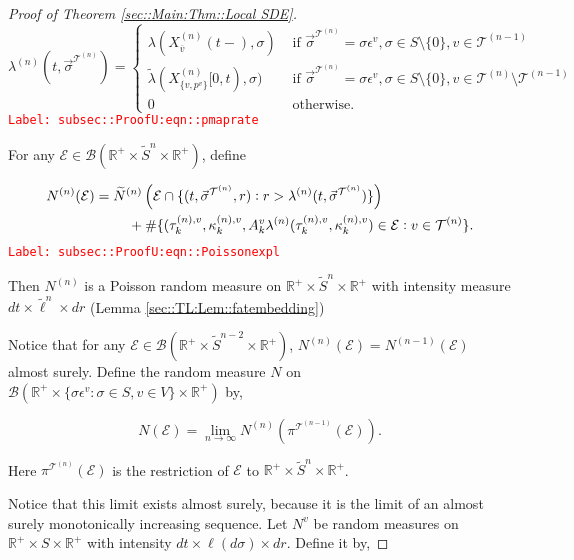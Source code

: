 \documentclass[12pt]{article}
\newcommand{\mb}{\mathbb}
\newcommand{\mc}{\mathcal}
\newcommand{\ms}{\mathscr}
\newcommand{\ra}{\rightarrow}
\newcommand{\ov}{\overline}
\newcommand{\te}{\text}
\newcommand{\ep}{\epsilon}
\newcommand{\tr}{\textcolor{red}}
\newcommand{\labe}[1]{\tr{\texttt{Label: #1}}}
\newcommand{\ind}{\hspace{24pt}}
\renewcommand{\v}{v}							%
\renewcommand{\S}{S}							%
\newcommand{\s}{\sigma}							%
\newcommand{\sv}{\vec{\s}}						%
\newcommand{\ev}{\ep}							%
\renewcommand{\t}{t}							%
\newcommand{\proj}{\pi}							%
\newcommand{\X}{X}								%
\newcommand{\vind}[1]{^{#1}}					%
\newcommand{\vsi}[1]{^{#1}}						%
\newcommand{\cind}[1]{_{#1}}					%
\newcommand{\cl}{\ov}							%
\newcommand{\tp}[1]{(#1)}						%
\newcommand{\tip}[1]{#1}						%
\newcommand{\slnvind}[2]{^{(#1),#2}}				%
\newcommand{\tree}{\mc{T}}						%
\newcommand{\sln}[1]{^{(#1)}}					%
\newcommand{\poiss}{N}							%
\newcommand{\Sm}{\ell}							%
\newcommand{\rate}{\lambda}						%
\renewcommand{\r}{r}							%
\newcommand{\alt}[1]{\widetilde{#1}}			%
\newcommand{\indx}[1]{_{#1}}					%
\newcommand{\rt}{\tau}							%
\renewcommand{\it}{k}							%
\newcommand{\evnt}{\mc{E}}						%
\newcommand{\rv}{A}								%
\renewcommand{\mark}{\kappa}					%
\newcommand{\crate}{\alt{\lambda}}				%
\newcommand{\p}{p}								%
\begin{document}
\begin{proof}[Proof of Theorem \ref{sec::Main:Thm::Local SDE}]
\begin{equation}
\rate\sln{n}(\t,\sv\vsi{\tree\sln{n}}) = \begin{cases}
\rate(\X\sln{n}\cind{\cl{\v}}\tp{\t-},\s) &\te{ if } \sv\vsi{\tree\sln{n}} = \s\ev\vind{\v},\s \in \S\setminus\{0\},\v\in\tree\sln{n-1}\\
\crate(\X\sln{n}\cind{\{\v,\p\vind{\v}\}}\tip{[0,\t)},\s) &\te{ if } \sv\vsi{\tree\sln{n}} = \s\ev\vind{\v},\s\in\S\setminus\{0\},\v\in\tree\sln{n}\setminus\tree\sln{n-1}\\
0 &\te{ otherwise.}
\end{cases}
\label{subsec::ProofU:eqn::pmaprate}
\end{equation}
\labe{subsec::ProofU:eqn::pmaprate}

For any \(\evnt \in \ms{B}(\mb{R}^+\times\alt{\S}^n\times\mb{R}^+)\), define

\begin{align}
\poiss\sln{n}(\evnt)& = \alt{\poiss}\sln{n}\left(\evnt\cap\{(\t,\sv\vsi{\tree\sln{n}},\r):\r > \rate\sln{n}(\t,\sv\vsi{\tree\sln{n}})\}\right)\nonumber\\
&\hspace{24 pt} + \#\{(\rt\slnvind{n}{\v}\indx{\it},\mark\indx{\it}\slnvind{n}{\v},\rv\vind{\v}\indx{\it}\rate\sln{n}(\rt\slnvind{n}{\v}\indx{\it},\mark\indx{\it}\slnvind{n}{\v}) \in \evnt: \v\in \tree\sln{n}\}.
\label{subsec::ProofU:eqn::Poissonexpl}
\end{align}
\labe{subsec::ProofU:eqn::Poissonexpl}

Then \(\poiss\sln{n}\) is a Poisson random measure on \(\mb{R}^+\times\alt{\S}^n\times \mb{R}^+\) with intensity measure \(d\t\times \alt{\Sm}^n\times d\r\) (Lemma \ref{sec::TL:Lem::fatembedding})

\ind Notice that for any \(\evnt \in \ms{B}(\mb{R}^+\times \alt{\S}^{n-2}\times \mb{R}^+)\), \(\poiss\sln{n}(\evnt) = \poiss\sln{n-1}(\evnt)\) almost surely. Define the random measure \(\poiss\) on \(\ms{B}(\mb{R}^+\times \{\s\ev\vind{\v}:\s\in \S,\v \in V\}\times \mb{R}^+)\) by,

\[\poiss(\evnt) = \lim_{n \ra\infty}\poiss\sln{n}\left(\proj\vsi{\tree\sln{n-1}}(\evnt)\right).\]

Here \(\proj\vsi{\tree\sln{n}}(\evnt)\) is the restriction of \(\evnt\) to \(\mb{R}^+\times \alt{\S}^n\times\mb{R}^+\). 

\ind Notice that this limit exists almost surely, because it is the limit of an almost surely monotonically increasing sequence. Let \(\poiss\vind{\v}\) be random measures on \(\mb{R}^+\times\S\times\mb{R}^+\) with intensity \(d\t\times\Sm(d\s)\times d\r\). Define it by,


\end{proof}
\end{document}
